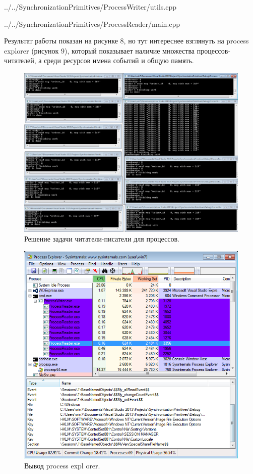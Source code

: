 \documentclass[a4paper, 12pt]{article}		%
\begin{document}

{../../SynchronizationPrimitives/ProcessWriter/utils.cpp}


{../../SynchronizationPrimitives/ProcessReader/main.cpp}

Результат работы показан на рисунке 8, но тут интереснее взглянуть на process explorer (рисунок 9), который показывает наличие множества процессов-читателей, а среди ресурсов имена событий и общую память.

\begin{figure}[h!]
\centering
\includegraphics[scale=0.45]{res/007}
\caption{Решение задачи читатели-писатели для процессов.}
\end{figure}

\begin{figure}[h!]
\centering
\includegraphics[scale=0.45]{res/pe_07}
\caption{Вывод process expl
orer.}
\end{figure}
\newpage
\end{document}

